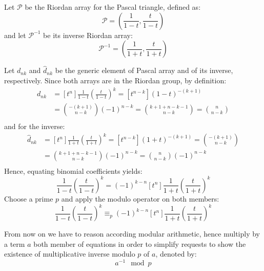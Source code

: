 \documentclass[11pt,a4paper]{article} %
\begin{document}
    Let $\mathcal{P}$ be the Riordan array for the Pascal triangle,
    defined as:
    \begin{displaymath} 
        \mathcal{P} = \left(\frac{1}{1-t}, \frac{t}{1-t}  \right)
    \end{displaymath} 
    and let $\mathcal{P}^{-1}$ be its inverse Riordan array:
    \begin{displaymath} 
        \mathcal{P}^{-1} = \left(\frac{1}{1+t}, \frac{t}{1+t}  \right)
    \end{displaymath} 
    
    Let $d_{nk}$ and $\hat{d}_{nk}$ be the generic element of Pascal
    array and of its inverse, respectively. Since both arrays are
    in the Riordan group, by definition:
    \begin{displaymath}
        \begin{split}
            d_{nk} &= [t^n]\frac{1}{1-t}\left(\frac{t}{1-t}\right)^k = [t^{n-k}](1-t)^{-(k+1)} \\
                &= {{-(k+1)} \choose {n-k}}(-1)^{n-k} = {{k+1 +n-k -1} \choose {n-k}} = {{n} \choose {n-k}} \\
        \end{split}
    \end{displaymath}
    and for the inverse:
    \begin{displaymath}
      \begin{split}
        \hat{d}_{nk} &= [t^n]\frac{1}{1+t}\left(\frac{t}{1+t}\right)^k = [t^{n-k}](1+t)^{-(k+1)} = 
        {{-(k+1)} \choose {n-k}} \\
        &= {{k+1 +n-k -1} \choose {n-k}} (-1)^{n-k} = {{n} \choose {n-k}} (-1)^{n-k}\\
      \end{split}
    \end{displaymath}
    Hence, equating binomial coefficients yields:
    \begin{displaymath}
      [t^n]\frac{1}{1-t}\left(\frac{t}{1-t}\right)^k = (-1)^{k-n}[t^n]\frac{1}{1+t}\left(\frac{t}{1+t}\right)^k 
    \end{displaymath}
    Choose a prime $p$ and apply the modulo operator on both members:
    \begin{displaymath}
      [t^n]\frac{1}{1-t}\left(\frac{t}{1-t}\right)^k \equiv_{p} (-1)^{k-n}[t^n]\frac{1}{1+t}\left(\frac{t}{1+t}\right)^k 
    \end{displaymath}

    From now on we have to reason according modular arithmetic, hence
    multiply by a term $a$ both member of equations in order to
    simplify requests to show the existence of multiplicative inverse
    modulo $p$ of $a$, denoted by: $$a^{-1}\mod p$$
\end{document}
